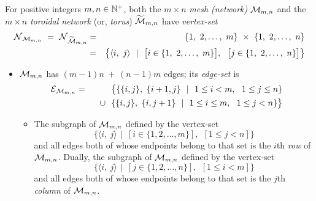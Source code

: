 For positive integers $m, n \in \mathbb{N}^+$, both the $m \times n$ {\it mesh (network)} $\mbox{$\cal M$}_{m,n}$ and the $m \times n$ {\it toroidal network} (or, {\it torus}) $\widetilde{\mbox{$\cal M$}}_{m,n}$ have {\it vertex-set}
\begin{eqnarray*}
\n_{\fm_{m,n}} \ = \ \n_{\widetilde{\fm}_{m,n}}
  & = & 
\{1, \ 2, \ldots, \ m\} \ \times \ \{1, \ 2, \ldots, \ n\} \\
  & = & 
\big\{ \langle i, \ j \rangle \ \ | \ \ 
\big[ i \in \{1, \ 2, \ldots, \ m\} \big], \ \ \big[ j \in \{1, \ 2, \ldots, \ n\} \big]
\big\}
\end{eqnarray*}

\begin{itemize}
\item
$\mbox{$\cal M$}_{m,n}$ has $(m-1)n \ + \ (n-1)m$ edges; its {\it edge-set} is
\begin{eqnarray*}
\mbox{$\cal E$}_{\mbox{{\scriptsize $\cal M$}}_{m,n}} & = & 
\big\{
\{ \{ i, j \}, \ \{ i+1, j \} \ \ | \ \
1 \leq i < m, \ \ 1 \leq j \leq n \} \\
  &  & \hspace*{.1in} \cup \ \
\{ \{ i, j \}, \ \{ i, j+1 \} \ \ | \ \ 1 \leq i \leq m, \ \ 1 \leq j < n \}
\big\}
\end{eqnarray*}


\begin{itemize}
\item
The subgraph of $\mbox{$\cal M$}_{m,n}$ defined by the vertex-set
\[ \{ \langle i, \ j \rangle  \ \ | \ \ \left[i \in \{1, 2, \ldots, m\}\right], \ \ \left[1 \leq j < n\right]\} \]
and all edges both of whose endpoints belong to that set is the $i$th {\it row} of $\mbox{$\cal M$}_{m,n}$.  Dually, the subgraph of $\mbox{$\cal M$}_{m,n}$ defined by the vertex-set
\[ \{ \langle i, \ j \rangle  \ \ | \ \ \left[j \in \{1, 2, \ldots, n\}\right], \ \ \left[1 \leq i < m\right] \} \]
and all edges both of whose endpoints belong to that set is the $j$th {\it column} of $\mbox{$\cal M$}_{m,n}$.

\end{itemize}
\end{itemize}
